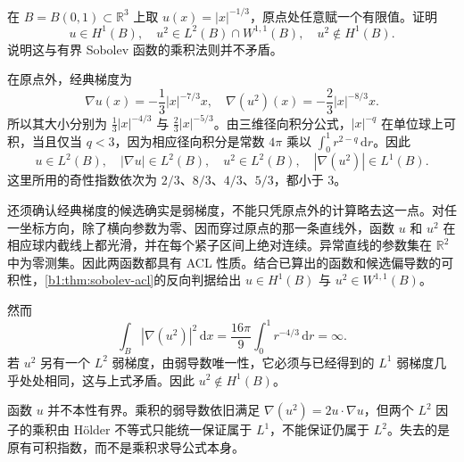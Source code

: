 \begin{exercise}\label{b1:ex:21-product-integrability-loss}
在 \(B=B(0,1)\subset\mathbb R^3\) 上取 \(u(x)=|x|^{-1/3}\)，原点处任意赋一个有限值。证明
\[
 u\in H^1(B),\quad
 u^2\in L^2(B)\cap W^{1,1}(B),\quad
 u^2\notin H^1(B).
\]
说明这与有界 Sobolev 函数的乘积法则并不矛盾。
\end{exercise}
\begin{solution}
在原点外，经典梯度为
\[
 \nabla u(x)=-\frac13|x|^{-7/3}x,\quad
 \nabla(u^2)(x)=-\frac23|x|^{-8/3}x.
\]
所以其大小分别为 \(\tfrac13|x|^{-4/3}\) 与 \(\tfrac23|x|^{-5/3}\)。由三维径向积分公式，\(|x|^{-q}\) 在单位球上可积，当且仅当 \(q<3\)，因为相应径向积分是常数 \(4\pi\) 乘以 \(\int_0^1r^{2-q}\,\mathrm dr\)。因此
\[
 u\in L^2(B),\quad |\nabla u|\in L^2(B),\quad
 u^2\in L^2(B),\quad |\nabla(u^2)|\in L^1(B).
\]
这里所用的奇性指数依次为 \(2/3\)、\(8/3\)、\(4/3\)、\(5/3\)，都小于 \(3\)。

还须确认经典梯度的候选确实是弱梯度，不能只凭原点外的计算略去这一点。对任一坐标方向，除了横向参数为零、因而穿过原点的那一条直线外，函数 \(u\) 和 \(u^2\) 在相应球内截线上都光滑，并在每个紧子区间上绝对连续。异常直线的参数集在 \(\mathbb R^2\) 中为零测集。因此两函数都具有 ACL 性质。结合已算出的函数和候选偏导数的可积性，\cref{b1:thm:sobolev-acl}的反向判据给出 \(u\in H^1(B)\) 与 \(u^2\in W^{1,1}(B)\)。

然而
\[
 \int_B|\nabla(u^2)|^2\,\mathrm dx
 =\frac{16\pi}{9}\int_0^1r^{-4/3}\,\mathrm dr=\infty.
\]
若 \(u^2\) 另有一个 \(L^2\) 弱梯度，由弱导数唯一性，它必须与已经得到的 \(L^1\) 弱梯度几乎处处相同，这与上式矛盾。因此 \(u^2\notin H^1(B)\)。

函数 \(u\) 并不本性有界。乘积的弱导数依旧满足 \(\nabla(u^2)=2u\cdot\nabla u\)，但两个 \(L^2\) 因子的乘积由 Hölder 不等式只能统一保证属于 \(L^1\)，不能保证仍属于 \(L^2\)。失去的是原有可积指数，而不是乘积求导公式本身。
\end{solution}

